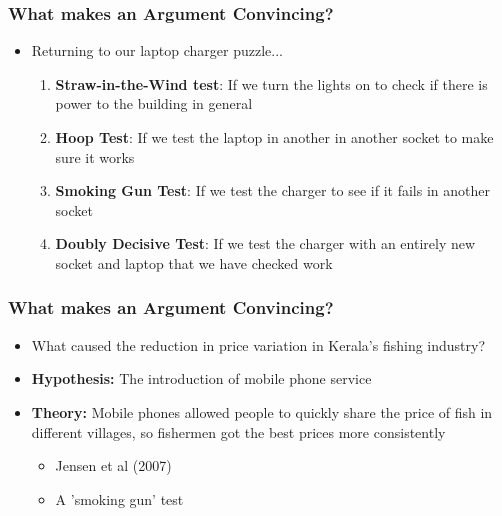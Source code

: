 \documentclass[xcolor=x11names,compress]{beamer}\usepackage[]{graphicx}\usepackage[]{color}
\renewcommand{\(}{\begin{columns}}
\renewcommand{\)}{\end{columns}}
\newcommand{\<}[1]{\begin{column}{#1}}
\renewcommand{\>}{\end{column}}
\begin{document}
\begin{frame}
\frametitle{What makes an Argument Convincing?}
\begin{itemize}
\item Returning to our laptop charger puzzle...
\begin{enumerate}
\item \textbf{Straw-in-the-Wind test}: If we turn the lights on to check if there is power to the building in general
\pause
\item \textbf{Hoop Test}: If we test the laptop in another in another socket to make sure it works
\pause
\item \textbf{Smoking Gun Test}: If we test the charger to see if it fails in another socket
\pause
\item \textbf{Doubly Decisive Test}: If we test the charger with an entirely new socket and laptop that we have checked work
\end{enumerate}
\end{itemize}
\end{frame}

\begin{frame}
\frametitle{What makes an Argument Convincing?}
\begin{itemize}
\item What caused the reduction in price variation in Kerala's fishing industry?
\item \textbf{Hypothesis:} The introduction of mobile phone service
\item \textbf{Theory:} Mobile phones allowed people to quickly share the price of fish in different villages, so fishermen got the best prices more consistently
\begin{itemize}
\item Jensen et al (2007)
\item A 'smoking gun' test
\end{itemize}
\end{itemize}
\end{frame}




\end{document}
